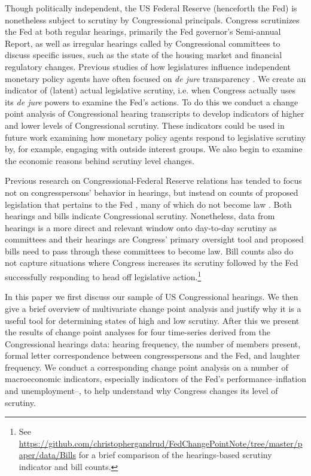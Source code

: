 \documentclass[a4paper]{article}\usepackage[]{graphicx}\usepackage[]{color}
\begin{document}
Though politically independent, the US Federal Reserve (henceforth the Fed) is nonetheless subject to scrutiny by Congressional principals. Congress scrutinizes the Fed at both regular hearings, primarily the Fed governor's Semi-annual Report, as well as irregular hearings called by Congressional committees to discuss specific issues, such as the state of the housing market and financial regulatory changes. Previous studies of how legislatures influence independent monetary policy agents have often focused on \emph{de jure} transparency \citep[for example][]{Stasavage2003}. We create an indicator of (latent) actual legislative scrutiny, i.e. when Congress actually uses its \emph{de jure} powers to examine the Fed's actions. To do this we conduct a change point analysis \citep{SenSrivastava1975, Killick2013, Matteson2014} of Congressional hearing transcripts to develop indicators of higher and lower levels of Congressional scrutiny. These indicators could be used in future work examining how monetary policy agents respond to legislative scrutiny by, for example, engaging with outside interest groups. We also begin to examine the economic reasons behind scrutiny level changes.

Previous research on Congressional-Federal Reserve relations has tended to focus not on congresspersons' behavior in hearings, but instead on counts of proposed legislation that pertains to the Fed \citep[e.g.][]{Kettl1988}, many of which do not become law \citep{Binder2014}. Both hearings and bills indicate Congressional scrutiny. Nonetheless, data from hearings is a more direct and relevant window onto day-to-day scrutiny as committees and their hearings are Congress' primary oversight tool \citep[][382]{oleszek2013} and proposed bills need to pass through these committees to become law. Bill counts also do not capture situations where Congress increases its scrutiny followed by the Fed successfully responding to head off legislative action.\footnote{See \url{https://github.com/christophergandrud/FedChangePointNote/tree/master/paper/data/Bills} for a brief comparison of the hearings-based scrutiny indicator and bill counts.}

In this paper we first discuss our sample of US Congressional hearings. We then give a brief overview of multivariate change point analysis and justify why it is a useful tool for determining states of high and low scrutiny. After this we present the results of change point analyses for four time-series derived from the Congressional hearings data: hearing frequency, the number of members present, formal letter correspondence between congresspersons and the Fed, and laughter frequency. We conduct a corresponding change point analysis on a number of macroeconomic indicators, especially indicators of the Fed's performance--inflation and unemployment--, to help understand why Congress changes its level of scrutiny.
\end{document}
